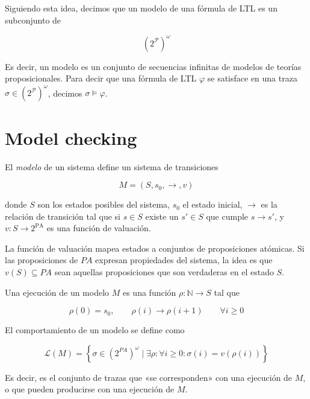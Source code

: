 \documentclass[a4paper, 12pt]{article}
\begin{document}
Siguiendo esta idea, decimos que un modelo de una fórmula de LTL es un
subconjunto de 

\begin{equation*}
    \left( 2^{\mathcal{P}} \right)^\omega
\end{equation*}

Es decir, un modelo es un conjunto de secuencias infinitas de modelos de teorías
proposicionales. Para decir que una fórmula de LTL $\varphi$ se satisface en una
traza $\sigma \in (2^{\mathcal{P}})^\omega$, decimos $\sigma \vDash \varphi$.

\section{Model checking}

El \textit{modelo} de un sistema define un sistema de transiciones 

\begin{equation*}
    M = (S, s_0, \to , v)
\end{equation*}

donde $S$ son los estados posibles del sistema, $s_0$ el estado inicial, $\to $
es la relación de transición tal que si $s \in S$ existe un $s' \in S$ que
cumple $s \to s'$, y $v : S \to 2^{\text{PA}}$ es una función de valuación.

La función de valuación mapea estados a conjuntos de proposiciones atómicas.
Si las proposiciones de $PA$ expresan propiedades del sistema, la idea es que 
$v(S) \subseteq PA$ sean aquellas proposiciones que son verdaderas en el estado
$S$.

Una ejecución de un modelo $M$ es una función $\rho : \mathbb{N} \to S$ tal que 

\begin{equation*}
    \rho(0) = s_0, \qquad \rho(i) \to \rho(i+1) \qquad \forall  i \geq 0
\end{equation*}

El comportamiento de un modelo se define como 

\begin{equation*}
    \mathcal{L}(M) = \left\{ \sigma \in (2^{PA})^\omega \mid \exists \rho
    :\forall  i \geq 0 : \sigma(i) = v \left( \rho \left( i \right)  \right)  \right\} 
\end{equation*}

Es decir, es el conjunto de trazas que «se corresponden» con una ejecución de
$M$, o que pueden producirse con una ejecución de $M$.
\end{document}
